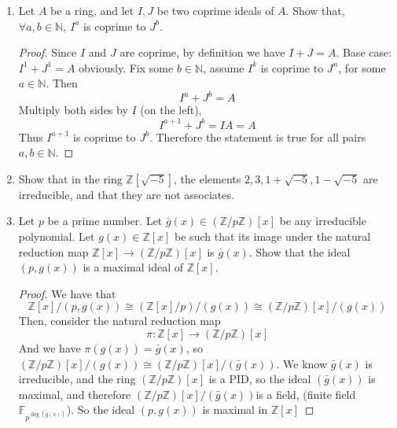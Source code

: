 \documentclass[hidelinks,12pt]{article}
\newcommand{\N}{\mathbb{N}}
\newcommand{\Z}{\mathbb{Z}}
\newcommand{\F}{\mathbb{F}}
\begin{document}
\begin{enumerate}
\begin{proof}
            \[
                k=a+b\cdot \frac{2+i}{5}=a+\frac{2b}{5}+\frac{bi}{5}
            \]
            for some \(a,b\in\Z\). Since \(k=\frac{p}{q}\) is strictly real, we must have
            \[
                \frac{bi}{5}=0\implies b=0
            \]
            But then \(k=a+0\in\Z\) contradiction.\\
            Similarly, write \(k=a+b\cdot \frac{2-i}{5}=a+\frac{2b}{5}-\frac{bi}{5}\) so \(\frac{bi}{5}=0\implies b=0\) so \(k\in\Z\).
        \end{proof}
    \item Let \(A\) be a ring, and let \(I,J\) be two coprime ideals of \(A\). Show that, \(\forall a,b\in\N,\ I^{a}\) is coprime to \(J^{b}\).
        \begin{proof}
            Since \(I\) and \(J\) are coprime, by definition we have \(I+J=A\). Base case: \(I^{1}+J^{1}=A\) obviously. Fix some \(b\in\N\), assume \(I^{k}\) is coprime to \(J^{n}\), for some \(a\in\N\). Then
            \[
                I^{a}+J^{b}=A
            \]
            Multiply both sides by \(I\) (on the left), \[
                I^{a+1}+J^{b}=IA=A
            \]
            Thus \(I^{a+1}\) is coprime to \(J^{b}\). Therefore the statement is true for all pairs \(a,b\in\N\).
        \end{proof}
    \item Show that in the ring \(\Z[\sqrt{-5}]\), the elements \(2,3,1+\sqrt{-5},1-\sqrt{-5}\) are irreducible, and that they are not associates.
    \item Let \(p\) be a prime number. Let \(\bar{g}(x)\in(\Z/p\Z)[x]\) be any irreducible polynomial. Let \(g(x)\in\Z[x]\) be such that its image under the natural reduction map \(\Z[x]\to(\Z/p\Z)[x]\) is \(\bar{g}(x)\). Show that the ideal \((p,g(x))\) is a maximal ideal of \(\Z[x]\).
        \begin{proof}
            We have that \[
                \Z[x]/(p,g(x))\cong(\Z[x]/p)/(g(x))\cong(\Z/p\Z)[x]/(g(x))
            \]
            Then, consider the natural reduction map
            \[
                \pi:\Z[x]\to(\Z/p\Z)[x]
            \]
            And we have \(\pi(g(x))=\bar{g}(x)\), so \((\Z/p\Z)[x]/(g(x))\cong(\Z/p\Z)[x]/(\bar{g}(x))\). We know \(\bar{g}(x)\) is irreducible, and the ring \((\Z/p\Z)[x]\) is a PID, so the ideal \((\bar{g}(x))\) is maximal, and therefore \((\Z/p\Z)[x]/(\bar{g}(x))\)is a field, (finite field \(\F_{p^{\deg(\bar{g}(x))}}\)). So the ideal \((p,g(x))\) is maximal in \(\Z[x]\)
        \end{proof}

\end{enumerate}
\end{document}

